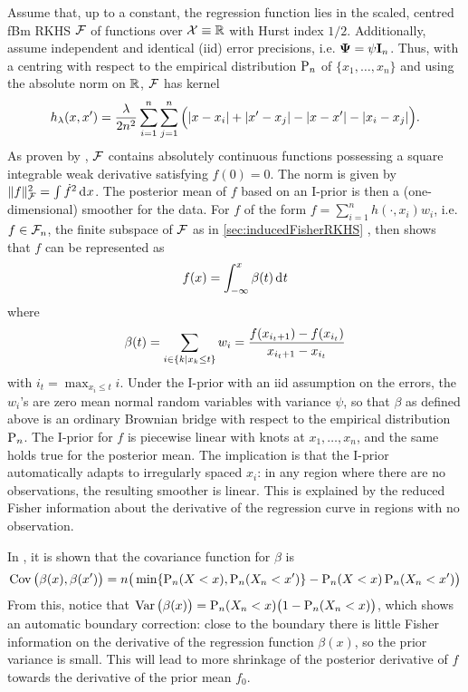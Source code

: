 Assume that, up to a constant, the regression function lies in the scaled, centred fBm RKHS ${\mathcal F}$ of functions over ${\mathcal X} \equiv \mathbb{R}$ with Hurst index $1/2$.
Additionally, assume independent and identical (iid) error precisions, i.e. ${\bm\Psi} = \psi{\mathbf I}_n$.
Thus, with a centring with respect to the empirical distribution $\operatorname{P}_n$ of $\{x_1,\dots,x_n\}$ and using the absolute norm on $\mathbb{R}$, ${\mathcal F}$ has kernel
\[
  h_\lambda(x,x') = \frac{\lambda}{2n^2} \sum_{i=1}^n\sum_{j=1}^n \Big( \lvert x-x_i\rvert + \lvert x'-x_j\rvert - \lvert x-x'\rvert - \lvert x_i-x_j\rvert \Big).
\]
As proven by \citet[Sec. 10]{van2008reproducing}, ${\mathcal F}$ contains absolutely continuous functions possessing a square integrable weak derivative satisfying $f(0)=0$.
The norm is given by $\lVert f\rVert^2_{\mathcal F} = \int \dot f^2 \operatorname{d}\hspace{0.5pt}\! x$.
The posterior mean of $f$ based on an I-prior is then a (one-dimensional) smoother for the data.
For $f$ of the form $f = \sum_{i=1}^n h(\cdot,x_i)w_i$, i.e. $f\in{\mathcal F}_n$, the finite subspace of ${\mathcal F}$ as in \cref{sec:inducedFisherRKHS} , then \citet{bergsma2017} shows that $f$ can be represented as 
\vspace{-0.5em}
\begin{align}\label{eq:ipriorbrownianbridge}
  f(x) = \int_{-\infty}^x \beta(t) \dint t \vspace{-0.5em}
\end{align}
where 
\vspace{-0.5em}
\begin{align}
  \beta(t) = \sum_{i\in\{k|x_k \leq t\}} w_i =  \frac{f(x_{i_t + 1}) - f(x_{i_t})}{x_{i_t + 1} - x_{i_t}} \vspace{-0.1em}
\end{align}
with $i_t = \max_{x_i \leq t} i$.
Under the I-prior with an iid assumption on the errors, the $w_i$'s are zero mean normal random variables with variance $\psi$, so that $\beta$ as defined above is an ordinary Brownian bridge with respect to the empirical distribution $\operatorname{P}_n$.
The I-prior for $f$ is piecewise linear with knots at $x_1,\dots,x_n$, and the same holds true for the posterior mean.
The implication is that the I-prior automatically adapts to irregularly spaced $x_i$: in any region where there are no observations, the resulting smoother is linear.
This is explained by the reduced Fisher information about the derivative of the regression curve in regions with no observation.

In \citet{bergsma2017}, it is shown that the covariance function for $\beta$ is 
\[
  \operatorname{Cov}\big(\beta(x),\beta(x') \big) = n \big( \min\{\operatorname{P}_n(X < x), \operatorname{P}_n(X_n < x') \} -  \operatorname{P}_n(X < x) \operatorname{P}_n(X_n < x') \big) 
\]
From this, notice that $\operatorname{Var} \big(\beta(x)\big) = \operatorname{P}_n(X_n < x)\big(1 - \operatorname{P}_n(X_n < x) \big)$, which shows an automatic boundary correction: close to the boundary there is little Fisher information on the derivative of the regression function $\beta(x)$, so the prior variance is small.
This will lead to more shrinkage of the posterior derivative of $f$ towards the derivative of the prior mean $f_0$.

